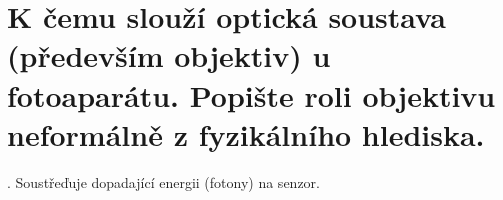\section{K čemu slouží optická soustava (především objektiv) u fotoaparátu. Popište roli objektivu neformálně z 
fyzikálního hlediska.}.
Soustřeďuje dopadající energii (fotony) na senzor.
